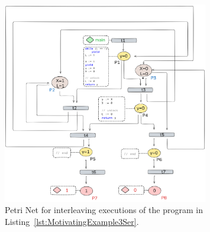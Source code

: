 \begin{figure}[!htbp]
	\centering
	\includegraphics[width=0.8\textwidth]{plots/code_3_PN_with_annotation.png}
	\caption{Petri Net for interleaving executions of the program in Listing~\ref{lst:MotivatingExample3Ser}.}
	\label{fig:code3ExamplePN}
\end{figure}

